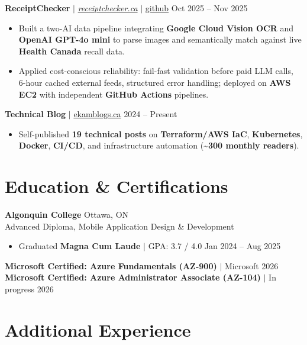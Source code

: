 \documentclass[11pt,a4paper]{article}
\begin{document}
\textbf{ReceiptChecker} $|$ \href{https://receiptchecker.ca/}{\emph{receiptchecker.ca}} $|$ \href{https://github.com/bhat0155/receipt-check}{\small github} \hfill Oct 2025 -- Nov 2025
\begin{itemize}
    \item Built a two-AI data pipeline integrating \textbf{Google Cloud Vision OCR} and \textbf{OpenAI GPT-4o mini} to parse images and semantically match against live \textbf{Health Canada} recall data.
    \item Applied cost-conscious reliability: fail-fast validation before paid LLM calls, 6-hour cached external feeds, structured error handling; deployed on \textbf{AWS EC2} with independent \textbf{GitHub Actions} pipelines.
\end{itemize}

\vspace{4pt}

\textbf{Technical Blog} $|$ \href{https://www.ekamblogs.ca}{ekamblogs.ca} \hfill 2024 -- Present
\begin{itemize}
    \item Self-published \textbf{19 technical posts} on \textbf{Terraform/AWS IaC}, \textbf{Kubernetes}, \textbf{Docker}, \textbf{CI/CD}, and infrastructure automation (\textasciitilde\textbf{300 monthly readers}).
\end{itemize}

\section{Education \& Certifications}

\textbf{Algonquin College} \hfill Ottawa, ON \\
Advanced Diploma, Mobile Application Design \& Development
\begin{itemize}
    \item Graduated \textbf{Magna Cum Laude} $|$ GPA: 3.7 / 4.0 \hfill Jan 2024 -- Aug 2025
\end{itemize}
\textbf{Microsoft Certified: Azure Fundamentals (AZ-900)} $|$ Microsoft \hfill 2026 \\
\textbf{Microsoft Certified: Azure Administrator Associate (AZ-104)} $|$ In progress \hfill 2026

\section{Additional Experience}
\end{document}
